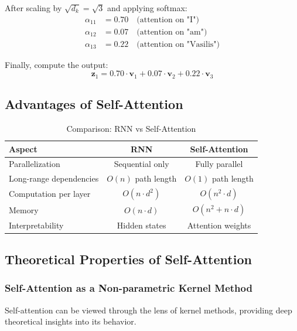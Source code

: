 After scaling by $\sqrt{d_k} = \sqrt{3}$ and applying softmax:
\begin{align}
\alpha_{11} &= 0.70 \quad \text{(attention on "I")} \\
\alpha_{12} &= 0.07 \quad \text{(attention on "am")} \\
\alpha_{13} &= 0.22 \quad \text{(attention on "Vasilis")}
\end{align}

Finally, compute the output:
\begin{equation}
\mathbf{z}_1 = 0.70 \cdot \mathbf{v}_1 + 0.07 \cdot \mathbf{v}_2 + 0.22 \cdot \mathbf{v}_3
\end{equation}

\subsection{Advantages of Self-Attention}

\begin{table}[H]
\centering
\caption{Comparison: RNN vs Self-Attention}
\begin{tabular}{l c c}
\toprule
\textbf{Aspect} & \textbf{RNN} & \textbf{Self-Attention} \\
\midrule
Parallelization & Sequential only & Fully parallel \\
Long-range dependencies & $O(n)$ path length & $O(1)$ path length \\
Computation per layer & $O(n \cdot d^2)$ & $O(n^2 \cdot d)$ \\
Memory & $O(n \cdot d)$ & $O(n^2 + n \cdot d)$ \\
Interpretability & Hidden states & Attention weights \\
\bottomrule
\end{tabular}
\end{table}

\subsection{Theoretical Properties of Self-Attention}

\subsubsection{Self-Attention as a Non-parametric Kernel Method}

Self-attention can be viewed through the lens of kernel methods, providing deep theoretical insights into its behavior.

